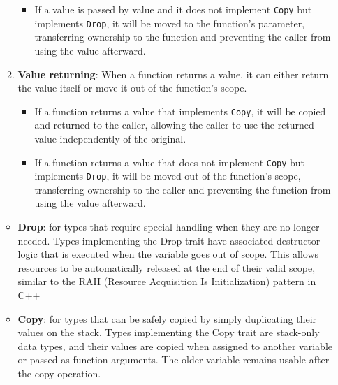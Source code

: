 \documentclass{article}
\begin{document}
\begin{itemize}
\begin{enumerate}
\begin{itemize}
        \item If a value is passed by value and it does not implement \texttt{Copy} but implements \texttt{Drop}, it will be moved to the function's parameter, transferring ownership to the function and preventing the caller from using the value afterward.
    \end{itemize}

    \item \textbf{Value returning}: When a function returns a value, it can either return the value itself or move it out of the function's scope.
    
    \begin{itemize}
        \item If a function returns a value that implements \texttt{Copy}, it will be copied and returned to the caller, allowing the caller to use the returned value independently of the original.
        
        \item If a function returns a value that does not implement \texttt{Copy} but implements \texttt{Drop}, it will be moved out of the function's scope, transferring ownership to the caller and preventing the function from using the value afterward.
    \end{itemize}
\end{enumerate}
    \begin{itemize}
        \item \textbf{Drop}: for types that require special handling when they are no longer needed. Types implementing the Drop trait have associated destructor logic that is executed when the variable goes out of scope. This allows resources to be automatically released at the end of their valid scope, similar to the RAII (Resource Acquisition Is Initialization) pattern in C++
        \item \textbf{Copy}: for types that can be safely copied by simply duplicating their values on the stack. Types implementing the Copy trait are stack-only data types, and their values are copied when assigned to another variable or passed as function arguments. The older variable remains usable after the copy operation.
    \end{itemize}
\end{itemize}
\end{document}
